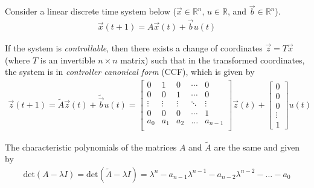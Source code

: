 


Consider a linear discrete time system below ($\vec{x} \in
\mathbb{R}^n$, $u \in \mathbb{R}$, and $\vec{b} \in \mathbb{R}^n$).
\begin{align*}
\vec{x}(t+1) = A \vec{x}(t) + \vec{b} u(t)
\end{align*}

If the system is \textit{controllable},
then there exists a change of coordinates $\vec{z} = T\vec{x}$ (where $T$ is an invertible $n\times n$ matrix)
such that in the transformed coordinates, the system is in
\textit{controller canonical form} (CCF), which is given by
\begin{align*}
\vec{z}(t+1) = \widetilde{A}\vec{z}(t) + \widetilde{\vec{b}} u(t) = \begin{bmatrix}
0 & 1 & 0 & \cdots & 0 \\
0 & 0 & 1 & \cdots & 0 \\
\vdots & \vdots & \vdots  & \ddots & \vdots \\
 0 & 0 & 0 & \cdots & 1 \\
 a_0 & a_{1} & a_{2} & \ldots & a_{n-1} \\
\end{bmatrix} 
\vec{z}(t) +
\begin{bmatrix}
0 \\ 0 \\ 0 \\ \vdots \\ 1
\end{bmatrix}
u(t)
\end{align*}

The characteristic polynomials of the matrices $A$ and $\widetilde{A}$ are the same and given by
\begin{align*}\label{eq:poly}
\boxed{\mbox{det}(A - \lambda I) = \mbox{det}(\widetilde{A} - \lambda I)
= \lambda^n  - a_{n-1} \lambda^{n-1} - a_{n-2} \lambda^{n-2} - \ldots - a_0}
\end{align*}


